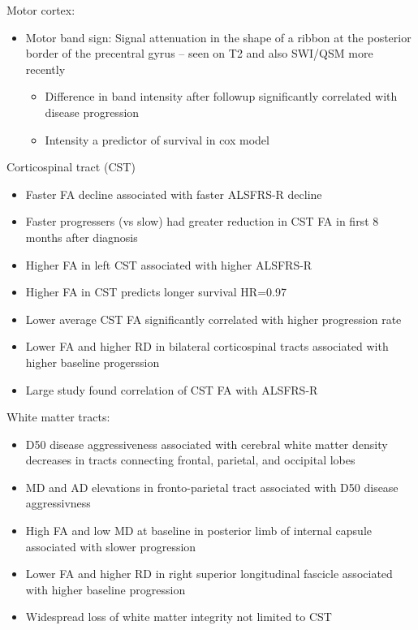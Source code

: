 Motor cortex:
\begin{itemize}
    \item Motor band sign: Signal attenuation in the shape of a ribbon at the posterior border of the precentral gyrus – seen on T2 and also SWI/QSM more recently
    \begin{itemize}
        \item Difference in band intensity after followup significantly correlated with disease progression~\cite{bollHypointensityMotorCortex2019}
        \item Intensity a predictor of survival in cox model~\cite{rizzoDiagnosticPrognosticValue2020}
    \end{itemize}
\end{itemize}

Corticospinal tract (CST)
\begin{itemize}
    \item Faster FA decline associated with faster ALSFRS-R decline~\cite{kalraProspectiveHarmonizedMulticenter2020}
    \item Faster progressers (vs slow) had greater reduction in CST FA in first 8 months after diagnosis~\cite{kalraProspectiveHarmonizedMulticenter2020}
    \item Higher FA in left CST associated with higher ALSFRS-R~\cite{liBrainstemInvolvementAmyotrophic2021}
    \item Higher FA in CST predicts longer survival HR=0.97~\cite{agostaMRIPredictorsLongterm2010}
    \item Lower average CST FA significantly correlated with higher progression rate~\cite{agostaMRIPredictorsLongterm2010}
    \item Lower FA and higher RD in bilateral corticospinal tracts associated with higher baseline progerssion~\cite{menkeWidespreadGreyMatter2014}
    \item Large study found correlation of CST FA with ALSFRS-R~\cite{mullerLargescaleMulticentreCerebral2016}
\end{itemize}

White matter tracts:
\begin{itemize}
    \item D50 disease aggressiveness associated with cerebral white matter density decreases in tracts connecting frontal, parietal, and occipital lobes~\cite{steinbachApplyingD50Disease2020}
    \item MD and AD elevations in fronto-parietal tract associated with D50 disease aggressivness~\cite{steinbachDiseaseAggressivenessSignatures2021}
    \item High FA and low MD at baseline in posterior limb of internal capsule associated with slower progression~\cite{grolezMRICervicalSpinal2018}
    \item Lower FA and higher RD in right superior longitudinal fascicle associated with higher baseline progression~\cite{menkeWidespreadGreyMatter2014}
    \item Widespread loss of white matter integrity not limited to CST
\end{itemize}

